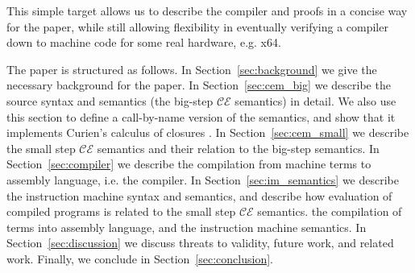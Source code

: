 This simple target allows us to describe the compiler and proofs in a concise
way for the paper, while still allowing flexibility in eventually verifying a
compiler down to machine code for some real hardware, e.g. x64.

The paper is structured as follows. In Section~\ref{sec:background} we give the
necessary background for the paper. In Section~\ref{sec:cem_big} we describe the
source syntax and semantics (the big-step $\mathcal{CE}$ semantics) in detail.
We also use this section to define a call-by-name version of the semantics, and
show that it implements Curien's calculus of closures \cite{curien}.  In
Section~\ref{sec:cem_small} we describe the small step $\mathcal{CE}$ semantics and
their relation to the big-step semantics. In Section~\ref{sec:compiler} we describe
the compilation from machine terms to assembly language, i.e. the compiler. In
Section~\ref{sec:im_semantics} we describe the instruction machine syntax and
semantics, and describe how evaluation of compiled programs is related to the
small step $\mathcal{CE}$ semantics. the compilation of terms into assembly
language, and the instruction machine semantics. In Section~\ref{sec:discussion} we
discuss threats to validity, future work, and related work. Finally, we conclude
in Section~\ref{sec:conclusion}.


